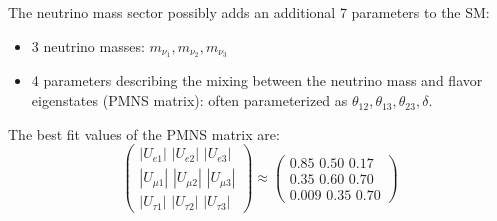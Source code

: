 The neutrino mass sector possibly adds an additional 7 parameters to the SM:
\begin{itemize}
\item 3 neutrino masses: $m_{\nu_{1}}, m_{\nu_{2}}, m_{\nu_{3}}$
\item 4 parameters describing the mixing between the neutrino mass and flavor eigenstates (PMNS matrix): often parameterized as $\theta_{12}, \theta_{13}, \theta_{23}, \delta$.
\end{itemize}

The best fit values of the PMNS matrix are:
\begin{equation}
\begin{pmatrix} |U_{e1}| \,\, |U_{e2}|  \,\, |U_{e3}| \\ |U_{\mu1}| \,\, |U_{\mu2}| \,\, |U_{\mu3}|  \\ |U_{\tau1}| \,\, |U_{\tau2}| \,\, |U_{\tau3}| \end{pmatrix} \approx
\begin{pmatrix} 0.85 \,\, 0.50  \,\, 0.17 \\ 0.35 \,\, 0.60 \,\, 0.70  \\ 0.009 \,\, 0.35 \,\, 0.70 \end{pmatrix}
\end{equation}
